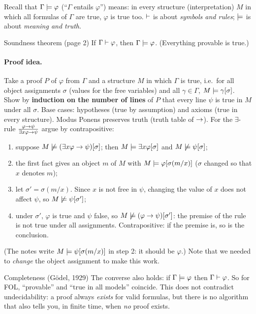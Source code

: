 Recall that $\Gamma \models \varphi$ (``$\Gamma$ entails $\varphi$'') means: in every
structure (interpretation) $M$ in which all formulas of $\Gamma$ are true, $\varphi$ is
true too. $\vdash$ is about \emph{symbols and rules}; $\models$ is about \emph{meaning and
truth}.

\begin{nbfact}{Soundness theorem (page 2)}
If $\Gamma \vdash \varphi$, then $\Gamma \models \varphi$. \quad (Everything provable is true.)
\end{nbfact}

\paragraph{Proof idea.} Take a proof $P$ of $\varphi$ from $\Gamma$ and a structure $M$ in
which $\Gamma$ is true, i.e.\ for all object assignments $\sigma$ (values for the free
variables) and all $\gamma \in \Gamma$, $M \models \gamma[\sigma]$. Show by
\textbf{induction on the number of lines} of $P$ that every line $\psi$ is true in $M$
under all $\sigma$. Base cases: hypotheses (true by assumption) and axioms (true in every
structure). Modus Ponens preserves truth (truth table of $\rightarrow$). For the
$\exists$-rule $\frac{\varphi \rightarrow \psi}{\exists x\varphi \rightarrow \psi}$ argue by
contrapositive:
\begin{enumerate}[nosep]
  \item suppose $M \not\models (\exists x\varphi \rightarrow \psi)[\sigma]$; then
        $M \models \exists x\varphi[\sigma]$ and $M \not\models \psi[\sigma]$;
  \item the first fact gives an object $m$ of $M$ with $M \models \varphi[\sigma(m/x)]$
        ($\sigma$ changed so that $x$ denotes $m$);
  \item let $\sigma' = \sigma(m/x)$. Since $x$ is not free in $\psi$, changing the value of
        $x$ does not affect $\psi$, so $M \not\models \psi[\sigma']$;
  \item under $\sigma'$, $\varphi$ is true and $\psi$ false, so
        $M \not\models (\varphi \rightarrow \psi)[\sigma']$: the premise of the rule is not true
        under all assignments. Contrapositive: if the premise is, so is the conclusion.
\end{enumerate}
(The notes write $M \models \psi[\sigma(m/x)]$ in step 2: it should be $\varphi$.) Note
that we needed to \emph{change} the object assignment to make this work.

\begin{nbfact}{Completeness (G\"odel, 1929)}
\notinslides
The converse also holds: if $\Gamma \models \varphi$ then $\Gamma \vdash \varphi$. So
for FOL, ``provable'' and ``true in all models'' coincide. This does not contradict
undecidability: a proof always \emph{exists} for valid formulas, but there is no
algorithm that also tells you, in finite time, when \emph{no} proof exists.
\end{nbfact}

